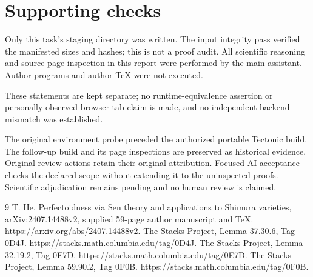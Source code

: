 \documentclass[10pt]{article}
\begin{document}
\section*{Supporting checks}
Only this task’s staging directory was written. The input integrity pass verified the manifested sizes and hashes; this is not a proof audit. All scientific reasoning and source-page inspection in this report were performed by the main assistant. Author programs and author TeX were not executed.\par
These statements are kept separate; no runtime-equivalence assertion or personally observed browser-tab claim is made, and no independent backend mismatch was established.\par
The original environment probe preceded the authorized portable Tectonic build. The follow-up build and its page inspections are preserved as historical evidence. Original-review actions retain their original attribution. Focused AI acceptance checks the declared scope without extending it to the uninspected proofs. Scientific adjudication remains pending and no human review is claimed.\par
9 T. He, Perfectoidness via Sen theory and applications to Shimura varieties, arXiv:2407.14488v2, supplied 59-page author manuscript and TeX. https://arxiv.org/abs/2407.14488v2. The Stacks Project, Lemma 37.30.6, Tag 0D4J. https://stacks.math.columbia.edu/tag/0D4J. The Stacks Project, Lemma 32.19.2, Tag 0E7D. https://stacks.math.columbia.edu/tag/0E7D. The Stacks Project, Lemma 59.90.2, Tag 0F0B. https://stacks.math.columbia.edu/tag/0F0B.\par
\end{document}
